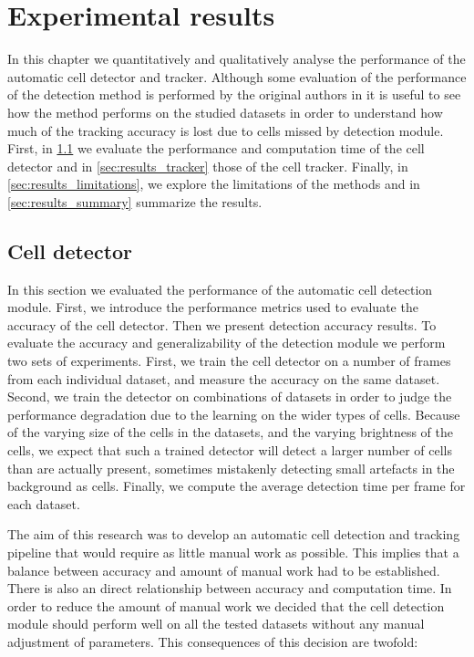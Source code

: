 \chapter{Experimental results }
\label{chap:results}

In this chapter we quantitatively and qualitatively analyse the performance of the automatic cell detector and tracker. Although some evaluation of the performance of the detection method is performed by the original authors in \cite{arteta12} it is useful to see how the method performs on the studied datasets in order to understand how much of the tracking accuracy is lost due to cells missed by detection module. First, in \cref{sec:results_detector} we evaluate the performance and computation time of the cell detector and in \cref{sec:results_tracker} those of the cell tracker. Finally, in \cref{sec:results_limitations}, we explore the limitations of the methods and in \cref{sec:results_summary} summarize the results.


	\section{Cell detector }
		\label{sec:results_detector}
		
		In this section we evaluated the performance of the automatic cell detection module. First, we introduce the performance metrics used to evaluate the accuracy of the cell detector. Then we present detection accuracy results. To evaluate the accuracy and generalizability of the detection module we perform two sets of experiments. First, we train the cell detector on a number of frames from each individual dataset, and measure the accuracy on the same dataset. Second, we train the detector on combinations of datasets in order to judge the performance degradation due to the learning on the wider types of cells. Because of the varying size of the cells in the datasets, and the varying brightness of the cells, we expect that such a trained detector will detect a larger number of cells than are actually present, sometimes mistakenly detecting small artefacts in the background as cells. Finally, we compute the average detection time per frame for each dataset.
		
		The aim of this research was to develop an automatic cell detection and tracking pipeline that would require as little manual work as possible. This implies that a balance between accuracy and amount of manual work had to be established. There is also an direct relationship between accuracy and computation time. In order to reduce the amount of manual work we decided that the cell detection module should perform well on all the tested datasets without any manual adjustment of parameters. This consequences of this decision are twofold:
		
